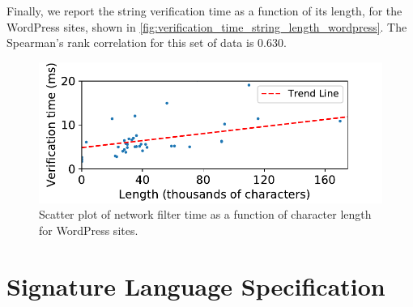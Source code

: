 Finally, we report the string verification time as a function of its length, for the WordPress sites, shown in \autoref{fig:verification_time_string_length_wordpress}. The Spearman's rank correlation for this set of data is 0.630.


\begin{figure}[h]
	\begin{center}
	\includegraphics[scale=0.55]{results/string_length_vs_verification_time_wordpress_small.pdf}
	
	\caption{Scatter plot of network filter time as a function of character length for WordPress sites.}
	\label{fig:verification_time_string_length_wordpress}
\end{center}
\end{figure}




\section{Signature Language Specification} \label{appendix:language_specification}

